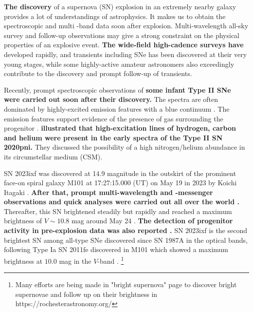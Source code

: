 \documentclass{pasj01}
\begin{document}
 {\bf The discovery} of a supernova (SN) explosion in an extremely nearby 
galaxy provides a lot of understandings of astrophysics. 
It makes us to obtain the spectroscopic and multi -band data
soon after explosion. Multi-wavelength 
all-sky survey and follow-up observations may give a strong 
constraint on the physical properties of an explosive event.
{\bf The wide-field high-cadence surveys have} developed rapidly, 
and transients including SNe has been discovered at 
their very young stages, while some highly-active amateur astronomers 
also exceedingly contribute to the discovery and prompt follow-up 
of transients.

 Recently, prompt spectroscopic observations of
{\bf some infant Type II SNe were carried out soon after their discovery.}
The spectra are often dominated by 
highly-excited emission features with a blue continuum 
\citep{Gal-Yam2014,Yaron2017}. The emission features
support evidence of the presence of gas surrounding 
the progenitor \citep{Gal-Yam2014}. 
{\bf \citet{Terreran2022} illustrated that high-excitation lines of 
hydrogen, carbon and helium were present in the early spectra 
of the Type II SN 2020pni.}
They discussed the possibility of a high nitrogen/helium abundance in its circumstellar medium (CSM).

 SN 2023ixf was discovered at 14.9 magnitude in
the outskirt of the prominent face-on spiral galaxy M101 
at 17:27:15.000 (UT) on May 19 in 2023 by Koichi Itagaki 
\citep{Itagaki2023ixf}. {\bf After that, prompt multi-wavelength 
and -messenger observations and quick analyses were carried 
out all over the world \citep{Thwaites2023,Kawai2023,Maund2023,YZhang2023,Grefenstette2023,Perley2023}.}
Thereafter, this SN brightened steadily but 
rapidly and reached a maximum brightness of $V\sim10.8$ 
mag around May 24 \citep{Fowler2023}. 
{\bf The detection of progenitor activity in pre-explosion data was also 
reported
\citep{Szali2023}.}
SN 2023ixf is the second brightest SN among all-type SNe discovered since SN 1987A in the optical bands, following Type Ia SN 2011fe discovered in M101 which showed a maximum brightness at $10.0$ mag in the $V$-band \citep{Pereira2013,KZhang2016}.
\footnote{Many efforts are being made in "bright supernova" page 
to discover bright supernovae and follow up on their brightness in https://rochesterastronomy.org/} 
\end{document}
